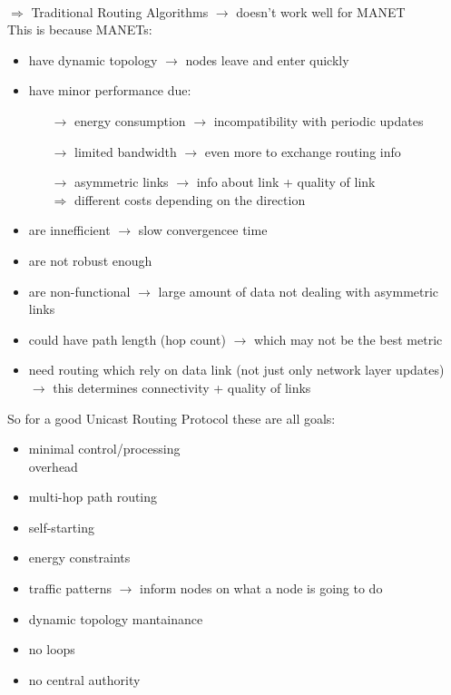 \\[0.3cm]
$\Rightarrow$ Traditional Routing Algorithms $\rightarrow$ doesn't work well for MANET\\
This is because MANETs:
\begin{itemize}
    \item have dynamic topology $\rightarrow$ nodes leave and enter quickly
    \item have minor performance due:
    \begin{itemize}
        \item[$\rightarrow$] energy consumption $\rightarrow$ incompatibility with periodic updates
        \item[$\rightarrow$] limited bandwidth $\rightarrow$ even more to exchange routing info
        \item[$\rightarrow$] asymmetric links $\rightarrow$ info about link + quality of link\\
        $\Rightarrow$ different costs depending on the direction
    \end{itemize}
    \item are innefficient $\rightarrow$ slow convergencee time
    \item are not robust enough
    \item are non-functional $\rightarrow$ large amount of data not dealing with asymmetric links
    \item could have path length (hop count) $\rightarrow$ which may not be the best metric
    \item need routing which rely on data link (not just only network layer updates)\\
    $\rightarrow$ this determines connectivity + quality of links
\end{itemize}
So for a good Unicast Routing Protocol these are all goals:\\[0.3cm]
\begin{minipage}{.5\linewidth}
    \begin{itemize}
        \item minimal control/processing\\overhead
        \item multi-hop path routing
        \item self-starting
        \item energy constraints
        \end{itemize}
\end{minipage}
\begin{minipage}{.5\linewidth}
    \begin{itemize}
        \item traffic patterns $\rightarrow$ inform nodes on what a node is going to do
        \item dynamic topology mantainance
        \item no loops
        \item no central authority
        \end{itemize}
\end{minipage}

